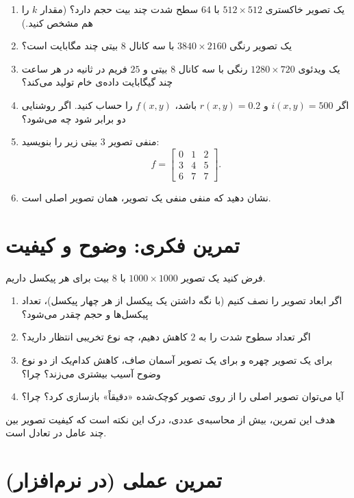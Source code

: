 \documentclass[11pt,a4paper]{article}
\begin{document}
	\begin{enumerate}
		\item یک تصویر خاکستری $512\times512$ با $64$ سطح شدت چند بیت حجم دارد؟
		(مقدار $k$ را هم مشخص کنید.)
		\item یک تصویر رنگی $3840\times2160$ با سه کانال $8$ بیتی چند مگابایت است؟
		\item یک ویدئوی $1280\times720$ رنگی با سه کانال $8$ بیتی و $25$ فریم در ثانیه
		در هر ساعت چند گیگابایت داده‌ی خام تولید می‌کند؟
		\item اگر $i(x,y)=500$ و $r(x,y)=0.2$ باشد، $f(x,y)$ را حساب کنید.
		اگر روشنایی دو برابر شود چه می‌شود؟
		\item منفی تصویر $3$ بیتی زیر را بنویسید:
		\[
		f=
		\begin{bmatrix}
			0 & 1 & 2\\
			3 & 4 & 5\\
			6 & 7 & 7
		\end{bmatrix}.
		\]
		\item نشان دهید که منفی منفی یک تصویر، همان تصویر اصلی است.
	\end{enumerate}
	
	
	\section{تمرین فکری: وضوح و کیفیت}
	
	فرض کنید یک تصویر $1000\times1000$ با $8$ بیت برای هر پیکسل داریم.
	
	\begin{enumerate}
		\item اگر ابعاد تصویر را نصف کنیم (با نگه داشتن یک پیکسل از هر چهار پیکسل)،
		تعداد پیکسل‌ها و حجم چقدر می‌شود؟
		\item اگر تعداد سطوح شدت را به $2$ کاهش دهیم، چه نوع تخریبی انتظار دارید؟
		\item برای یک تصویر چهره و برای یک تصویر آسمان صاف، کاهش کدام‌یک از دو نوع وضوح
		آسیب بیشتری می‌زند؟ چرا؟
		\item آیا می‌توان تصویر اصلی را از روی تصویر کوچک‌شده «دقیقاً» بازسازی کرد؟ چرا؟
	\end{enumerate}
	
	هدف این تمرین، بیش از محاسبه‌ی عددی، درک این نکته است که کیفیت تصویر
	بین چند عامل در تعادل است.
	
	
	\section{تمرین عملی (در نرم‌افزار)}
	
\end{document}
